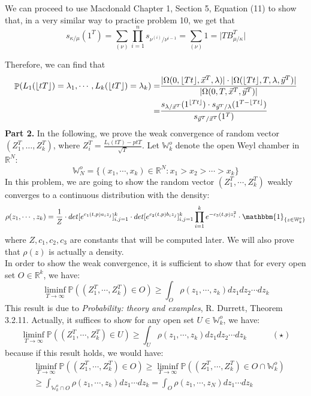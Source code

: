\documentclass[12pt]{article}
\DeclareMathOperator{\pr}{\mathbb{P}}
\DeclarePairedDelimiter\floor{\lfloor}{\rfloor}
\begin{document}
We can proceed to use Macdonald Chapter 1, Section 5, Equation (11) to show that, in a very similar way to practice problem 10, we get that 
\[s_{\kappa/\mu}(1^T)=\sum_{(\nu)}\prod_{i=1}^n s_{\nu^{(i)}/\nu^{i-1}}=\sum_{(\nu)} 1=\lvert TB_{\mu/\kappa}^T\rvert\]

Therefore, we can find that 
\begin{align*}
\pr(L_1(\lfloor tT\rfloor)=\lambda_1,\cdots, L_k(\lfloor tT\rfloor)=\lambda_k)
=&{}\frac{\lvert \Omega(0,\lfloor Tt\rfloor, \vec{x}^T, \lambda)\rvert\cdot \lvert \Omega(\lfloor Tt\rfloor ,T, \lambda, \vec{y}^T)\rvert}{\lvert \Omega(0, T, \vec{x}^T, \vec{y}^T)\rvert}\\
=&{}\frac{s_{\lambda/\vec{x}^T}(1^{\floor{Tt}})\cdot s_{\vec{y}^T/\lambda}(1^{T-\floor{Tt}})}{s_{\vec{y}^T/\vec{x}^T}(1^T)}
\end{align*}
\textbf{Part 2. } In the following, we prove the weak convergence of random vector $(Z_{1}^{T},\dots,Z_{k}^{T})$, where $Z_{i}^{T}=\frac{L_{i}(tT)-ptT}{\sqrt{T}}$. Let $\mathbb{W}_{k}^{o}$ denote the open Weyl chamber in $\mathbb{R}^{N}$:
$$\mathbb{W}_{N}^{o}=\{(x_{1},\cdots,x_{k})\in\mathbb{R}^{N}:x_{1}>x_{2}>\cdots>x_{k}\}$$ 
In this problem, we are going to show the random vector $(Z_{1}^{T},\cdots,Z_{k}^{T})$ weakly converges to a continuous distribution with the density:
$$\rho(z_{1},\cdots,z_{k})=\frac{1}{Z}\cdot det[e^{c_1(t,p)a_{i}z_{j}}]_{i,j=1}^{k}\cdot det[e^{c_2(t,p)b_{i}z_{j}}]_{i,j=1}^{k}\prod_{i=1}^{k}e^{-c_{3}(t,p)z_{i}^{2}}\cdot \mathbbm{1}_{\{z\in \mathbb{W}_{k}^{o}\}}$$
where $Z,c_{1},c_{2},c_{3}$ are constants that will be computed later. We will also prove that $\rho(z)$ is actually a density.\\
In order to show the weak convergence, it is sufficient to show that for every open set $O\in\mathbb{R}^{k}$, we have: 
$$\liminf_{T\rightarrow\infty}\mathbb{P}((Z_{1}^{T},\cdots,Z_{k}^{T})\in O)\geqslant\int_{O}\rho(z_{1},\cdots,z_{k})dz_{1}dz_{2}\cdots dz_{k}$$
This result is due to \emph{Probability: theory and examples}, R. Durrett, Theorem 3.2.11. Actually, it suffices to show for any open set $U\in\mathbb{W}_{k}^{o}$, we have:
$$\liminf_{T\rightarrow\infty}\mathbb{P}((Z_{1}^{T},\cdots,Z_{k}^{T})\in U)\geqslant\int_{U}\rho(z_{1},\cdots,z_{k})dz_{1}dz_{2}\cdots dz_{k}\quad\quad\quad (\star)$$
because if this result holds, we would have:
\begin{align*}
	&\liminf_{T\rightarrow\infty}\mathbb{P}((Z_{1}^{T},\cdots,Z_{k}^{T})\in O)\geqslant\liminf_{T\rightarrow\infty}\mathbb{P}((Z_{1}^{T},\cdots,Z_{k}^{T})\in O\cap\mathbb{W}_{k}^{o})\\
	&\geqslant \int_{\mathbb{W}_{k}^{o}\cap O}\rho(z_{1},\cdots,z_{k})dz_{1}\cdots dz_{k}= \int_{O}\rho(z_{1},\cdots,z_{N})dz_{1}\cdots dz_{k}
\end{align*}
\end{document}
